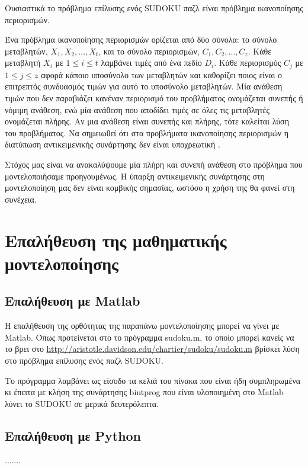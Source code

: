 \documentclass[12pt]{book}
\theoremstyle{definition}
\begin{document}
Ουσιαστικά το πρόβλημα επίλυσης ενός SUDOKU παζλ είναι πρόβλημα ικανοποίησης περιορισμών. \par 

Ένα πρόβλημα ικανοποίησης περιορισμών ορίζεται από δύο σύνολα: το σύνολο μεταβλητών, \(X_1, X_2, \dots, X_t\), και το σύνολο περιορισμών, \(C_1, C_2, \dots, C_z\). Κάθε μεταβλητή \(X_i\) με \(1 \leq i \leq t\) λαμβάνει τιμές από ένα πεδίο \(D_i\). Κάθε περιορισμός \(C_j\) με \(1 \leq j \leq z\) αφορά κάποιο υποσύνολο των μεταβλητών και καθορίζει ποιος είναι ο επιτρεπτός συνδυασμός τιμών για αυτό το υποσύνολο μεταβλητών. Μία ανάθεση τιμών που δεν παραβιάζει κανέναν περιορισμό του προβλήματος ονομάζεται συνεπής ή νόμιμη ανάθεση, ενώ μία ανάθεση που αποδίδει τιμές σε όλες τις μεταβλητές ονομάζεται πλήρης. Αν μια ανάθεση είναι συνεπής και πλήρης, τότε καλείται λύση του προβλήματος. Να σημειωθεί ότι στα προβλήματα ικανοποίησης περιορισμών η διατύπωση αντικειμενικής συνάρτησης δεν είναι υποχρεωτική \cite{4}. \par

Στόχος μας είναι να ανακαλύψουμε μία πλήρη και συνεπή ανάθεση στο πρόβλημα που μοντελοποιήσαμε προηγουμένως. Η ύπαρξη αντικειμενικής συνάρτησης στη μοντελοποίηση μας δεν είναι κομβικής σημασίας, ωστόσο η χρήση της θα φανεί στη συνέχεια.

\section{Επαλήθευση της μαθηματικής μοντελοποίησης}

\subsection{Επαλήθευση με Matlab}

Η επαλήθευση της ορθότητας της παραπάνω μοντελοποίησης μπορεί να γίνει με Matlab. Όπως προτείνεται στο \cite{3} το πρόγραμμα sudoku.m, το οποίο μπορεί κανείς να το βρει στο \url{http://aristotle.davidson.edu/chartier/sudoku/sudoku.m} βρίσκει λύση στο πρόβλημα επίλυσης ενός παζλ SUDOKU. \par

Το πρόγραμμα λαμβάνει ως είσοδο τα κελιά του πίνακα που είναι ήδη συμπληρωμένα κι έπειτα με κλήση της συνάρτησης bintprog που είναι υλοποιημένη στο Matlab λύνει το SUDOKU σε μερικά δευτερόλεπτα. 

\subsection{Επαλήθευση με Python}
.......
\end{document}
